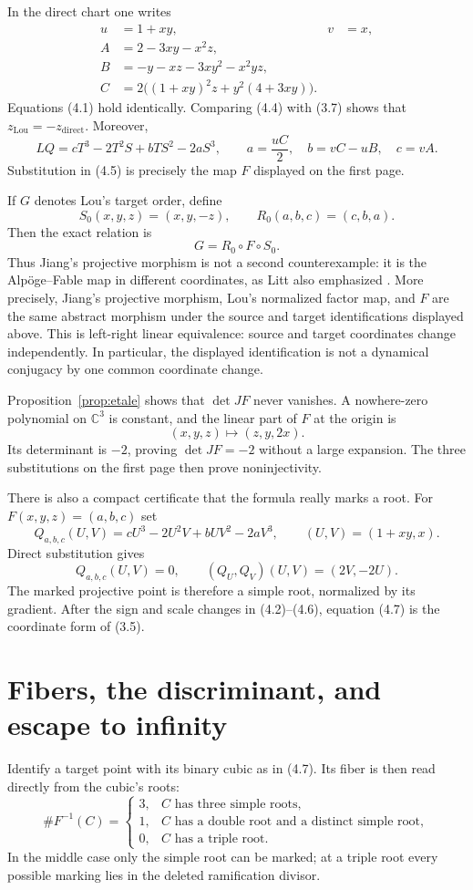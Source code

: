 \documentclass[11pt,a4paper]{article}
\theoremstyle{remark}
\newcommand{\C}{\mathbb C}
\begin{document}
In the direct chart one writes
\begin{align*}
u&=1+xy,&v&=x,\\
A&=2-3xy-x^2z,\\
B&=-y-xz-3xy^2-x^2yz,\\
C&=2\bigl((1+xy)^2z+y^2(4+3xy)\bigr).
\tag{4.4}
\end{align*}
Equations (4.1) hold identically.  Comparing (4.4) with (3.7) shows that
$z_{\mathrm{Lou}}=-z_{\mathrm{direct}}$.  Moreover,
\[
LQ=cT^3-2T^2S+bTS^2-2aS^3,
\qquad
a=\frac{uC}{2},\quad b=vC-uB,\quad c=vA.
\tag{4.5}
\]
Substitution in (4.5) is precisely the map $F$ displayed on the first page.

If $G$ denotes Lou's target order, define
\[
S_0(x,y,z)=(x,y,-z),\qquad R_0(a,b,c)=(c,b,a).
\]
Then the exact relation is
\[
  \boxed{G=R_0\circ F\circ S_0.}
\tag{4.6}
\]
Thus Jiang's projective morphism is not a second counterexample: it is the
Alp\"oge--Fable map in different coordinates, as Litt also emphasized
\cite{LittComment}.  More precisely, Jiang's projective morphism, Lou's
normalized factor map, and $F$ are the same abstract morphism under the
source and target identifications displayed above.
This is left-right linear equivalence: source and target coordinates change
independently.  In particular, the displayed identification is not a
dynamical conjugacy by one common coordinate change.

Proposition~\ref{prop:etale} shows that $\det JF$ never vanishes.  A
nowhere-zero polynomial on $\C^3$ is constant, and the linear part of $F$ at
the origin is
\[
  (x,y,z)\longmapsto(z,y,2x).
\]
Its determinant is $-2$, proving $\det JF=-2$ without a large expansion.
The three substitutions on the first page then prove noninjectivity.

There is also a compact certificate that the formula really marks a root.
For $F(x,y,z)=(a,b,c)$ set
\[
Q_{a,b,c}(U,V)=cU^3-2U^2V+bUV^2-2aV^3,
\qquad (U,V)=(1+xy,x).
\]
Direct substitution gives
\[
Q_{a,b,c}(U,V)=0,\qquad
(Q_U,Q_V)(U,V)=(2V,-2U).
\tag{4.7}
\]
The marked projective point is therefore a simple root, normalized by its
gradient.  After the sign and scale changes in (4.2)--(4.6), equation (4.7)
is the coordinate form of (3.5).

\section{Fibers, the discriminant, and escape to infinity}

Identify a target point with its binary cubic as in (4.7).  Its fiber is then
read directly from the cubic's roots:
\[
\#F^{-1}(C)=
\begin{cases}
3,&C\text{ has three simple roots},\\
1,&C\text{ has a double root and a distinct simple root},\\
0,&C\text{ has a triple root}.
\end{cases}
\tag{5.1}
\]
In the middle case only the simple root can be marked; at a triple root every
possible marking lies in the deleted ramification divisor.
\end{document}

